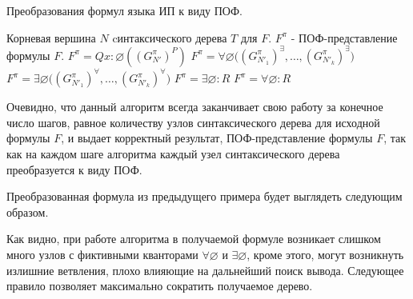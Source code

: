 \documentclass[a4paper,12pt]{article}
\begin{document}
\renewcommand{\algorithmicrequire}{\textbf{Input:}}
\renewcommand{\algorithmicensure}{\textbf{Output:}}
\begin{algorithm}
\caption{ Преобразования формул языка ИП к виду ПОФ.}

\begin{algorithmic}
\REQUIRE Корневая вершина $N$ cинтаксического дерева $T$ для $F$.
\ENSURE $F^{\pi}$ - ПОФ-представление формулы $F$.
  \RETURN  $F^{\pi} = Qx\colon\varnothing ( (G_{N'}^{\pi})^{P} )$   
\ENDIF
{}
  \RETURN  $F^{\pi} = \forall\varnothing \bigl( (G_{N'_1}^{\pi})^{\exists},\ldots,(G_{N'_k}^{\pi})^{\exists}\bigr)$
\ENDIF
{}
  \RETURN  $F^{\pi} = \exists\varnothing \bigl( (G_{N'_1}^{\pi})^{\forall},\ldots,(G_{N'_k}^{\pi})^{\forall}\bigr)$ 
\ENDIF
{}
  \RETURN  $F^{\pi} = \exists\varnothing\colon R$
\ENDIF
{}
  \RETURN  $F^{\pi} = \forall\varnothing\colon R$ 
\ENDIF
\end{algorithmic}
\end{algorithm}
Очевидно, что данный алгоритм всегда заканчивает свою работу за конечное число шагов, равное количеству узлов синтаксического дерева для исходной формулы $F$, и выдает корректный результат, ПОФ-представление формулы $F$, так как на каждом шаге алгоритма каждый узел синтаксического дерева преобразуется к виду ПОФ.

Преобразованная формула из предыдущего примера будет выглядеть следующим образом.

\begin{center}
\end{center}

Как видно, при работе алгоритма в получаемой формуле возникает слишком много узлов с фиктивными кванторами $\forall\varnothing$ и $\exists\varnothing$, кроме этого, могут возникнуть излишние ветвления, плохо влияющие на дальнейший поиск вывода. Следующее правило позволяет максимально сократить получаемое дерево.
\end{document}

